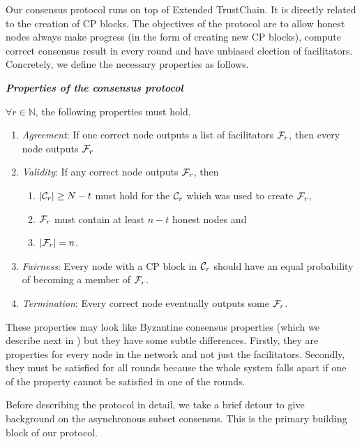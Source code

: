 Our consensus protocol runs on top of Extended TrustChain.
It is directly related to the creation of CP blocks.
The objectives of the protocol are to
    allow honest nodes always make progress (in the form of creating new CP blocks),
    compute correct consensus result in every round
    and have unbiased election of facilitators.
Concretely, we define the necessary properties as follows.
\begin{definition}
\label{def:consensus}
\textbf{\emph{Properties of the consensus protocol}}

$\forall r \in \mathbb{N}$, the following properties must hold.
\begin{enumerate}
    \item \emph{Agreement}:
        If one correct node outputs a list of facilitators $\mathcal{F}_r$,
        then every node outputs $\mathcal{F}_r$
    \item \emph{Validity}:
        If any correct node outputs $\mathcal{F}_r$, then 
            \begin{enumerate}
                \item $|\mathcal{C}_r| \ge N - t$ must hold for the $\mathcal{C}_r$ which was used to create $\mathcal{F}_r$,
                \item $\mathcal{F}_r$ must contain at least $n - t$ honest nodes and
                \item $|\mathcal{F}_r| = n$.
            \end{enumerate}
    \item \emph{Fairness}:
        Every node with a CP block in $\mathcal{C}_r$ should have an equal probability of becoming a member of $\mathcal{F}_r$.
    \item \emph{Termination}:
        Every correct node eventually outputs some $\mathcal{F}_r$.
\end{enumerate}
\end{definition}
These properties may look like Byzantine consensus properties (which we describe next in ) but they have some subtle differences.
Firstly, they are properties for every node in the network and not just the facilitators.
Secondly, they must be satisfied for all rounds because the whole system falls apart if one of the property cannot be satisfied in one of the rounds.

Before describing the protocol in detail,
we take a brief detour to give background on the asynchronous subset consensus.
This is the primary building block of our protocol.

